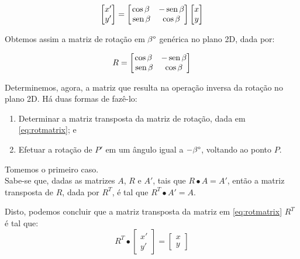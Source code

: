 \documentclass[a4paper,11pt,pagenumber=true]{article}
\renewcommand{\sin}{\text{\,sen\,}}
\theoremstyle{mytheor}
\begin{document}
            \begin{equation}
                \begin{bmatrix}
                    x' \\ y'
                \end{bmatrix} = 
                \begin{bmatrix}
                    \cos \beta & -\sin \beta  \\
                    \sin \beta & \cos \beta
                \end{bmatrix}
                \begin{bmatrix}
                    x \\ y
                \end{bmatrix}                
            \end{equation}

            Obtemos assim a matriz de rotação em $\beta\degree$ genérica no plano 2D, dada por: 
            
            \begin{equation}
                R = 
                \begin{bmatrix}
                    \cos \beta & -\sin \beta  \\
                    \sin \beta & \cos \beta
                \end{bmatrix}
                \label{eq:rotmatrix}
            \end{equation}
            
            Determinemos, agora, a matriz que resulta na operação inversa da rotação no plano 2D. Há duas formas de fazê-lo: 
            \begin{enumerate}
                \item Determinar a matriz transposta da matriz de rotação, dada em \ref{eq:rotmatrix}; e
                \item Efetuar a rotação de $P'$ em um ângulo igual a $-\beta\degree$, voltando ao ponto $P$.
            \end{enumerate}
            
            Tomemos o primeiro caso. \\
            
            Sabe-se que, dadas as matrizes $A$, $R$ e $A'$, tais que $R\bullet A=A'$, então a matriz transposta de $R$, dada por $R^T$, é tal que $R^T\bullet A' = A$.
            
            Disto, podemos concluir que a matriz transposta da matriz em \ref{eq:rotmatrix} $R^T$ é tal que: 
            \[
                R^T \bullet
                \begin{bmatrix}
                    x' \\ y'
                \end{bmatrix} = 
                \begin{bmatrix}
                    x \\ y
                \end{bmatrix}
            \]
            
\end{document}
